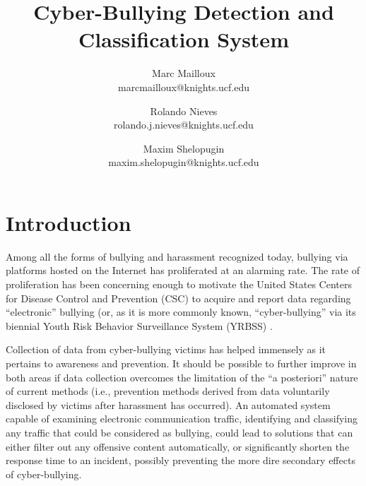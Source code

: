 \documentclass[conference]{sig-alternate-05-2015}
\begin{document}
\title{Cyber-Bullying Detection and Classification System}



\author{
  Marc Mailloux\\ marcmailloux@knights.ucf.edu
  \and Rolando Nieves\\ rolando.j.nieves@knights.ucf.edu
  \and Maxim Shelopugin\\ maxim.shelopugin@knights.ucf.edu
}

\maketitle


\section{Introduction}\label{sec:introduction}
Among all the forms of bullying and harassment recognized today, bullying via
platforms hosted on the Internet has proliferated at an alarming rate. The rate
of proliferation has been concerning enough to motivate the United States
Centers for Disease Control and Prevention (CSC) to acquire and report data
regarding ``electronic'' bullying (or, as it is more commonly known,
``cyber-bullying'' via its biennial Youth Risk Behavior Surveillance System
(YRBSS) \cite{CBRC_facts2018}.

Collection of data from cyber-bullying victims has helped immensely as it
pertains to awareness and prevention. It should be possible to further improve
in both areas if data collection overcomes the limitation of the
``a posteriori'' nature of current methods (i.e., prevention methods derived
from data voluntarily disclosed by victims after harassment has occurred). An
automated system capable of examining electronic communication traffic,
identifying and classifying any traffic that could be considered as bullying,
could lead to solutions that can either filter out any offensive content
automatically, or significantly shorten the response time to an incident,
possibly preventing the more dire secondary effects of cyber-bullying.
\end{document}
